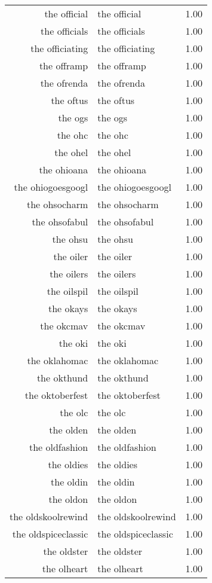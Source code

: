 \begin{table}[ht]
\begin{tabular}{rlr}
  the official & the official & 1.00 \\ 
  the officials & the officials & 1.00 \\ 
  the officiating & the officiating & 1.00 \\ 
  the offramp & the offramp & 1.00 \\ 
  the ofrenda & the ofrenda & 1.00 \\ 
  the oftus & the oftus & 1.00 \\ 
  the ogs & the ogs & 1.00 \\ 
  the ohc & the ohc & 1.00 \\ 
  the ohel & the ohel & 1.00 \\ 
  the ohioana & the ohioana & 1.00 \\ 
  the ohiogoesgoogl & the ohiogoesgoogl & 1.00 \\ 
  the ohsocharm & the ohsocharm & 1.00 \\ 
  the ohsofabul & the ohsofabul & 1.00 \\ 
  the ohsu & the ohsu & 1.00 \\ 
  the oiler & the oiler & 1.00 \\ 
  the oilers & the oilers & 1.00 \\ 
  the oilspil & the oilspil & 1.00 \\ 
  the okays & the okays & 1.00 \\ 
  the okcmav & the okcmav & 1.00 \\ 
  the oki & the oki & 1.00 \\ 
  the oklahomac & the oklahomac & 1.00 \\ 
  the okthund & the okthund & 1.00 \\ 
  the oktoberfest & the oktoberfest & 1.00 \\ 
  the olc & the olc & 1.00 \\ 
  the olden & the olden & 1.00 \\ 
  the oldfashion & the oldfashion & 1.00 \\ 
  the oldies & the oldies & 1.00 \\ 
  the oldin & the oldin & 1.00 \\ 
  the oldon & the oldon & 1.00 \\ 
  the oldskoolrewind & the oldskoolrewind & 1.00 \\ 
  the oldspiceclassic & the oldspiceclassic & 1.00 \\ 
  the oldster & the oldster & 1.00 \\ 
  the olheart & the olheart & 1.00 \\ 

\end{tabular}
\end{table}
